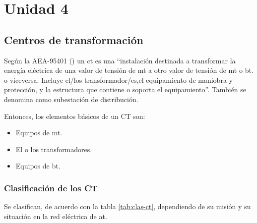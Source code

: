 \chapter{Unidad 4}

\section{Centros de transformación}

Según la AEA-95401 (\cite{aea95401}) un \acrfull{ct} es una ``instalación destinada a transformar la energía eléctrica de una valor de tensión de \acrshort{mt} a otro valor de
tensión de \acrshort{mt} o \acrshort{bt}. o viceversa. Incluye el/los transformador/es,el equipamiento de maniobra y protección, y la estructura que contiene o soporta el equipamiento''. También se denomina como subestación de distribución.


Entonces, los elementos básicos de un CT son:

\begin{itemize}
	\item Equipos de \acrshort{mt}.
	\item El o los transformadores.
	\item Equipos de \acrshort{bt}.
\end{itemize}

\subsection{Clasificación de los CT}

Se clasifican, de acuerdo con la tabla \ref{tab:clas-ct}, dependiendo de su misión y su situación en la red eléctrica de \acrshort{at}.

